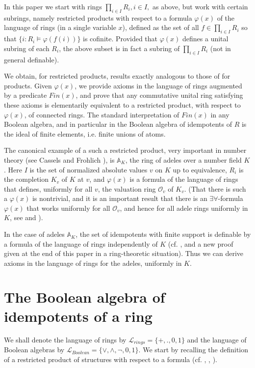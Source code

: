 \documentclass[12pt]{amsart}
\def\A{\mathbb{A}}
\def\cL{\mathcal{L}}
\def\A{\mathbb{A}}
\def\cL{\mathcal{L}}
\def\cO{\mathcal{O}}
\numberwithin{equation}{section}
\begin{document}
In this paper we start with rings $\prod_{i\in I} R_i, i\in I,$ as above, but work with certain subrings, namely restricted products with respect to a formula $\varphi(x)$ of the language of rings (in a single variable $x$), 
defined as the set of all $f\in \prod_{i\in I} R_i$ so that 
$\{i: R_i \models \varphi(f(i))\}$ is cofinite. Provided that $\varphi(x)$ defines a unital subring of each $R_i$, the above subset is in fact a subring of $\prod_{i\in I} R_i$ (not in general definable). 

We obtain, for restricted products, results exactly analogous to those of \cite{elem-prod} for products. 
Given $\varphi(x)$, we provide axioms in the language of rings augmented by a predicate $Fin(x)$, and prove that
any commutative unital ring satisfying these axioms is elementarily equivalent to a restricted product, with respect to 
$\varphi(x)$, of connected rings. The standard interpretation of $Fin(x)$ in any Boolean algebra, and in particular in the Boolean algebra of idempotents of $R$ is the ideal of finite elements, i.e. finite unions of atoms.

The canonical example of a such a restricted product, very important in number theory (see Cassels and Frohlich \cite{CF}), is $\A_K$, the ring of adeles over a number field $K$. Here $I$ is the set of normalized absolute values $v$ on $K$ up to equivalence, $R_i$ is the completion $K_v$ of $K$ at $v$, and $\varphi(x)$ is a formula of the language of rings that defines, uniformly for all $v$, the valuation ring $\cO_v$ of $K_v$. (That there is such a $\varphi(x)$ is nontrivial, and it is an important result that there is an $\exists \forall$-formula $\varphi(x)$ that works uniformly for all $\cO_v$, and hence for all adele rings  uniformly in $K$, see \cite{CDLM} and \cite{DM-ad}).

In the case of adeles $\A_K$, the set of idempotents with finite support is definable by a formula of the language of rings independently of $K$ (cf. \cite{DM-ad}, and a new proof given at the end of this paper in a ring-theoretic situation). Thus we can derive axioms in the language of rings for the adeles, uniformly in $K$.


\section{\bf The Boolean algebra of idempotents of a ring}

We shall denote the language of rings by $\cL_{rings}=\{+,.,0,1\}$ and the language of Boolean algebras by 
$\mathcal{L}_{Boolean}=\{\vee,\wedge,\neg,0,1\}$. We start by recalling the definition of a restricted product of structures with respect to a formula (cf. \cite{DM-ad}, \cite{DM-supp}, \cite{DM-ad2}).
\end{document}
